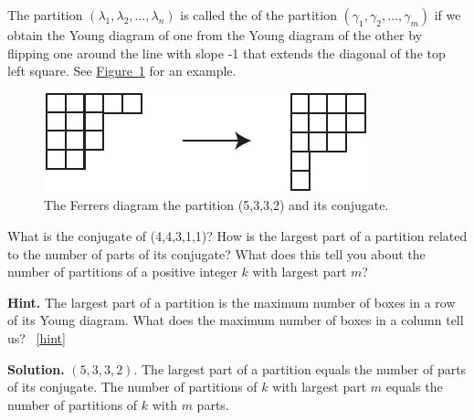 \documentclass{book}
\begin{document}
\setcounter{project}{304}
\addtocounter{project}{-1}
\begin{activity}[]\label{activity-297}
\hypertarget{p-1518}{}%
The partition \((\lambda_1,\lambda_2,\ldots, \lambda_n)\) is called the  of the partition \((\gamma_1,\gamma_2,\ldots, \gamma_m)\) if we obtain the Young diagram of one from the Young diagram of the other by flipping one around the line with slope -1 that extends the diagonal of the top left square. See \hyperref[conjugateYoung]{Figure~\ref{conjugateYoung}} for an example.%
\begin{figure}
\centering
\includegraphics[width=0.5\linewidth]{images/conjugateYoung}
\caption{The Ferrers diagram the partition (5,3,3,2) and its conjugate.\label{conjugateYoung}}
\end{figure}
\hypertarget{p-1519}{}%
What is the conjugate of (4,4,3,1,1)? How is the largest part of a partition related to the number of parts of its conjugate? What does this tell you about the number of partitions of a positive integer \(k\) with largest part \(m\)?%
\par\smallskip%
\noindent\textbf{Hint.}\hypertarget{hint-190}{}\quad%
\hypertarget{p-1520}{}%
The largest part of a partition is the maximum number of boxes in a row of its Young diagram. What does the maximum number of boxes in a column tell us?%
~\hfill{\tiny\hyperlink{a-304}{[hint]}\hypertarget{q-304}{}}\par\smallskip%
\noindent\textbf{Solution.}\hypertarget{solution-192}{}\quad%
\hypertarget{p-1521}{}%
\((5,3,3,2)\). The largest part of a partition equals the number of parts of its conjugate. The number of partitions of \(k\) with largest part \(m\) equals the number of partitions of \(k\) with \(m\) parts.%
\end{activity}

\clearpage
\end{document}
